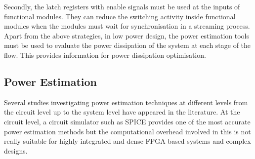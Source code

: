 Secondly, the latch registers with enable signals must be used at the inputs of functional modules.
They can reduce the switching activity inside functional modules when the modules must wait for synchronisation in a streaming process.
Apart from the above strategies, in low power design, the power estimation tools must be used to evaluate the power dissipation of the system at each stage of the flow.
This provides information for power dissipation optimisation.

\subsection{Power Estimation}

Several studies investigating power estimation techniques at different levels from the circuit level up to the system level have appeared in the literature.
At the circuit level, a circuit simulator such as SPICE \cite{Deng1994} provides one of the most accurate power estimation methods but the computational overhead involved in this is not really suitable for highly integrated and dense FPGA based systems and complex designs.

%

